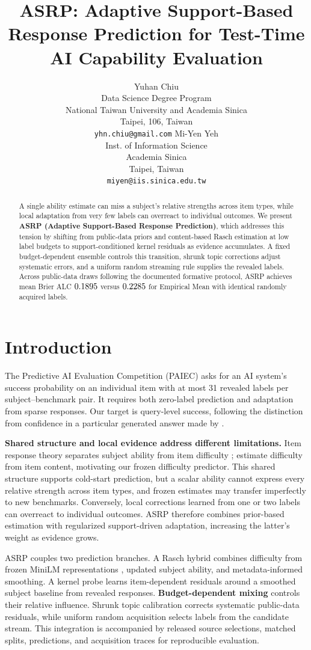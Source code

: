 \documentclass{article}
\title{ASRP: Adaptive Support-Based Response Prediction for Test-Time AI Capability Evaluation}
\author{%
  Yuhan Chiu \\
  Data Science Degree Program \\
  National Taiwan University and Academia Sinica \\
  Taipei, 106, Taiwan \\
  \texttt{yhn.chiu@gmail.com}
  \And
  Mi-Yen Yeh \\
  Inst. of Information Science \\
  Academia Sinica \\
  Taipei, Taiwan \\
  \texttt{miyen@iis.sinica.edu.tw}
}
\begin{document}
\maketitle

\begin{abstract}
A single ability estimate can miss a subject's relative strengths across item types, while local adaptation from very few labels can overreact to individual outcomes. We present \textbf{ASRP (Adaptive Support-Based Response Prediction)}, which addresses this tension by shifting from public-data priors and content-based Rasch estimation at low label budgets to support-conditioned kernel residuals as evidence accumulates. A fixed budget-dependent ensemble controls this transition, shrunk topic corrections adjust systematic errors, and a uniform random streaming rule supplies the revealed labels. Across \ProxyDraws{} public-data draws following the documented formative protocol, ASRP achieves mean Brier ALC $0.1895{}$ versus $0.2285{}$ for Empirical Mean with identical randomly acquired labels.
\end{abstract}

\section{Introduction}

The Predictive AI Evaluation Competition (PAIEC) asks for an AI system's success probability on an individual item with at most 31 revealed labels per subject--benchmark pair. It requires both zero-label prediction and adaptation from sparse responses. Our target is query-level success, following the distinction from confidence in a particular generated answer made by \citet{capability_calibration}.

\textbf{Shared structure and local evidence address different limitations.} Item response theory separates subject ability from item difficulty \citep{lord1980}; \citet{amortized_eval} estimate difficulty from item content, motivating our frozen difficulty predictor. This shared structure supports cold-start prediction, but a scalar ability cannot express every relative strength across item types, and frozen estimates may transfer imperfectly to new benchmarks. Conversely, local corrections learned from one or two labels can overreact to individual outcomes. ASRP therefore combines prior-based estimation with regularized support-driven adaptation, increasing the latter's weight as evidence grows.

ASRP couples two prediction branches. A Rasch hybrid combines difficulty from frozen MiniLM representations \citep{wang2020minilm}, updated subject ability, and metadata-informed smoothing. A kernel probe learns item-dependent residuals around a smoothed subject baseline from revealed responses. \textbf{Budget-dependent mixing} controls their relative influence. Shrunk topic calibration corrects systematic public-data residuals, while uniform random acquisition selects labels from the candidate stream. This integration is accompanied by released source selections, matched splits, predictions, and acquisition traces for reproducible evaluation.
\end{document}
